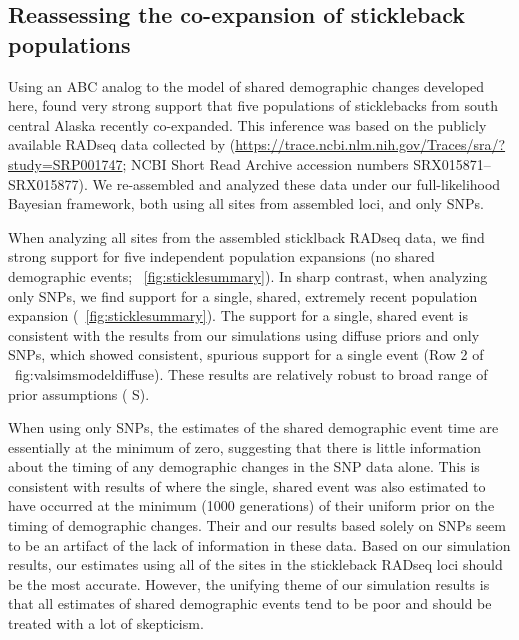 \ifembed{

}{}




\subsection{Reassessing the co-expansion of stickleback populations}

Using an ABC analog to the model of shared demographic changes
developed here, \citet{Xue2015} found very strong support that
five populations of sticklebacks from south central Alaska 
recently co-expanded.
This inference was based on the publicly available RADseq data collected by
\citet{Hohenlohe2010}
(\url{https://trace.ncbi.nlm.nih.gov/Traces/sra/?study=SRP001747};
NCBI Short Read Archive accession numbers SRX015871--SRX015877).
We re-assembled and analyzed these data under our full-likelihood
Bayesian framework, both using all sites from assembled loci,
and only SNPs.

When analyzing all sites from the assembled sticklback
RADseq data, we find strong support for five independent
population expansions (no shared demographic events;
\fig{}~\ref{fig:sticklesummary}).
In sharp contrast, when analyzing only SNPs, we find
support for a single, shared, extremely recent population expansion
(\fig{}~\ref{fig:sticklesummary}).
The support for a single, shared event is consistent with the results from our
simulations using diffuse priors and only SNPs,
which showed consistent, spurious support for a single event
(Row 2 of \fig{}~{fig:valsimsmodeldiffuse}).
These results are relatively robust to broad range of prior
assumptions
(\figs
S).

\ifembed{

}{}

When using only SNPs, the estimates of the shared demographic event time are
essentially at the minimum of zero, suggesting that there is little information
about the timing of any demographic changes in the SNP data alone.
This is consistent with results of \citet{Xue2015} where the single, shared
event was also estimated to have occurred at the minimum (1000 generations) of
their uniform prior on the timing of demographic changes.
Their and our results based solely on SNPs seem to be an artifact of the lack
of information in these data.
Based on our simulation results, our estimates using all of the sites
in the stickleback RADseq loci should be the most accurate.
However, the unifying theme of our simulation results is that all estimates of
shared demographic events tend to be poor and should be treated with
a lot of skepticism.
